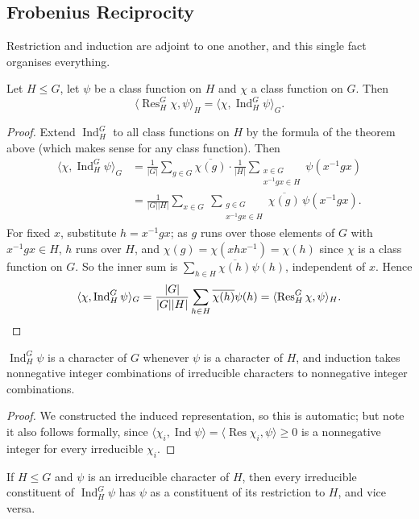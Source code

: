 \documentclass[a4paper]{scrartcl}
\newcommand{\Ind}{\operatorname{Ind}}
\newcommand{\Res}{\operatorname{Res}}
\newcommand{\ip}[2]{\langle #1, #2 \rangle}
\begin{document}
\subsection{Frobenius Reciprocity}

Restriction and induction are adjoint to one another, and this single fact organises everything.

\begin{theorem}
	Let $H\leq G$, let $\psi$ be a class function on $H$ and $\chi$ a class function on $G$. Then
	$$\ip{\Res^G_H\chi}{\psi}_H = \ip{\chi}{\Ind_H^G\psi}_G.$$
\end{theorem}
\begin{proof}
	Extend $\Ind_H^G$ to all class functions on $H$ by the formula of the theorem above (which makes sense for any class function). Then
	\begin{align*}
		\ip{\chi}{\Ind_H^G\psi}_G &= \frac1{|G|}\sum_{g\in G}\overline{\chi(g)}\cdot\frac1{|H|}\sum_{\substack{x\in G\\x^{-1}gx\in H}}\psi(x^{-1}gx)\\
		&= \frac1{|G||H|}\sum_{x\in G}\ \sum_{\substack{g\in G\\ x^{-1}gx\in H}}\overline{\chi(g)}\,\psi(x^{-1}gx).
	\end{align*}
	For fixed $x$, substitute $h = x^{-1}gx$; as $g$ runs over those elements of $G$ with $x^{-1}gx\in H$, $h$ runs over $H$, and $\chi(g) = \chi(xhx^{-1}) = \chi(h)$ since $\chi$ is a class function on $G$. So the inner sum is $\sum_{h\in H}\overline{\chi(h)}\psi(h)$, independent of $x$. Hence
	$$\ip\chi{\Ind_H^G\psi}_G = \frac{|G|}{|G||H|}\sum_{h\in H}\overline{\chi(h)}\psi(h) = \ip{\Res^G_H\chi}{\psi}_H. \qedhere$$
\end{proof}

\begin{corollary}
	$\Ind_H^G\psi$ is a character of $G$ whenever $\psi$ is a character of $H$, and induction takes nonnegative integer combinations of irreducible characters to nonnegative integer combinations.
\end{corollary}
\begin{proof}
	We constructed the induced representation, so this is automatic; but note it also follows formally, since $\ip{\chi_i}{\Ind\psi} = \ip{\Res\chi_i}{\psi} \geq 0$ is a nonnegative integer for every irreducible $\chi_i$.
\end{proof}

\begin{corollary}
	If $H \leq G$ and $\psi$ is an irreducible character of $H$, then every irreducible constituent of $\Ind_H^G\psi$ has $\psi$ as a constituent of its restriction to $H$, and vice versa.
\end{corollary}
\end{document}
